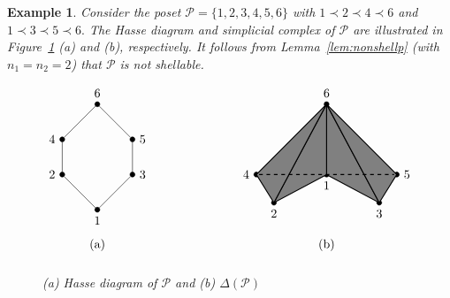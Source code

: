 \documentclass[letterpaper,10pt]{article}
\newtheorem{ex}[theorem]{Example}
\begin{document}
\begin{ex}\label{ex:hex}
Consider the poset $\mathcal{P}=\{1,2,3,4,5,6\}$ with $1\prec 2\prec 4\prec 6$ and $1\prec 3\prec 5\prec 6.$ The Hasse diagram and simplicial complex of $\mathcal{P}$ are illustrated in Figure~\ref{fig:hex} \textup(a\textup) and \textup(b\textup), respectively. It follows from Lemma~\ref{lem:nonshellp} \textup(with $n_1=n_2=2$\textup) that $\mathcal{P}$ is not shellable.

\begin{figure}[H]
$$\begin{tikzpicture}
    \node (1) at (0, 0) [circle, draw = black, fill = black, inner sep = 0.5mm, label=below:{1}]{};
    \node (2) at (-1, 1) [circle, draw = black, fill = black, inner sep = 0.5mm, label=left:{2}]{};
    \node (3) at (1, 1) [circle, draw = black, fill = black, inner sep = 0.5mm, label=right:{3}]{};
    \node (4) at (-1, 2) [circle, draw = black, fill = black, inner sep = 0.5mm, label=left:{4}]{};
    \node (5) at (1, 2) [circle, draw = black, fill = black, inner sep = 0.5mm, label=right:{5}]{};
    \node (6) at (0, 3) [circle, draw = black, fill = black, inner sep = 0.5mm, label=above:{6}]{};

    \draw (1)--(2)--(4)--(6)--(5)--(3)--(1);

    \node at (0,-1){(a)};
\end{tikzpicture}\hspace{1in} \begin{tikzpicture}[scale=2]
	\node (1) at (0, 0) [circle, draw = black, fill = black, inner sep = 0.5mm, label=below:{1}]{};
	\node (6) at (0,1)[circle, draw = black, fill = black, inner sep = 0.5mm, label=above:{6}] {};
    \node (5) at (1,0) [circle, draw = black, fill = black, inner sep = 0.5mm, label=right:{5}]{};
    \node (3) at (0.75,-0.4) [circle, draw = black, fill = black, inner sep = 0.5mm, label=below:{3}]{};
    \node (4) at (-1,0) [circle, draw = black, fill = black, inner sep = 0.5mm, label=left:{4}]{};
    \node (2) at (-0.75,-0.4) [circle, draw=black, fill=black, inner sep=0.5mm, label=below:{2}]{};

    \draw [fill=gray, thick] (0,0)--(0.75,-0.4)--(0,1)--(0,0);
    \draw [fill=gray, thick] (0,0)--(-0.75,-0.4)--(0,1)--(0,0);
    \draw [fill=gray, thick] (0.75,-0.4)--(1,0)--(0,1)--(0.75,-0.4);
    \draw [fill=gray, thick] (-0.75,-0.4)--(-1,0)--(0,1)--(-0.75,-0.4);
    \draw [thick, dashed] (4)--(5);

    \node at (0,-1){(b)};
\end{tikzpicture}$$
\caption{(a) Hasse diagram of $\mathcal{P}$ and (b) $\Delta(\mathcal{P})$}
\label{fig:hex}
\end{figure}
\end{ex}
\end{document}
